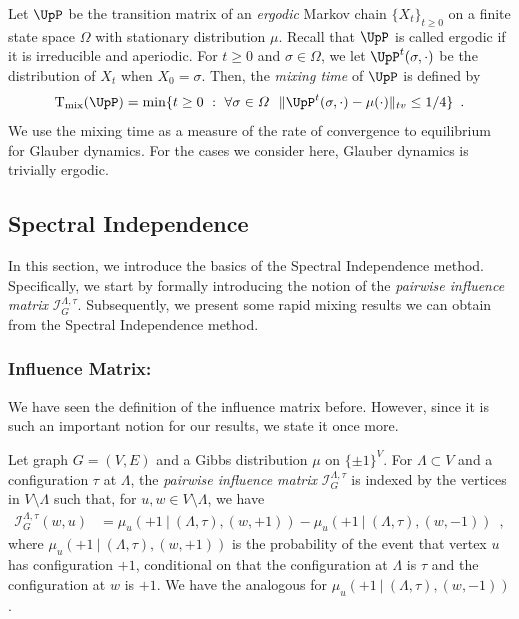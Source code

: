 \documentclass[11pt,reqno]{amsart}
\numberwithin{equation}{section}
\newcommand{\cI}{{\mathcal{I}}}
\newcommand{\blue}[1]{{\color{blue}#1}}
\newcommand{\cadmiumorange}[1]{{\color{cadmiumorange}#1}}
\newcommand{\goldenbrown}[1]{{\color{goldenbrown}#1}}
\newcommand{\red}[1]{{\color{red}#1}}
\newcommand{\Glauber}{{\{X_{\kt}\}_{\kt\geq 0}}}
\newcommand{\infmatrix}{\cI}
\newcommand{\norm}[2]{\goldenbrown{\|} #1 \goldenbrown{\|}_{#2}}
\newcommand{\tv}{tv}
\renewcommand{\blue}[1]{#1}
\renewcommand{\cadmiumorange}[1]{#1}
\renewcommand{\goldenbrown}[1]{#1}
\renewcommand{\red}[1]{#1}
\newcommand{\kt}{\cadmiumorange{t}}
\newcommand{\ku}{\red{u}}
\newcommand{\kw}{\blue{w}}
\renewcommand{\kt}{t}
\renewcommand{\ku}{u}
\renewcommand{\kw}{w}
\begin{document}
Let $\UpP$ be the transition matrix of an {\em ergodic} Markov chain $\Glauber$ on a finite state space
$\Omega$ with stationary distribution $\mu$. Recall that $\UpP$ is called ergodic if it is irreducible and aperiodic. 
%
For $\kt\geq 0$ and $\sigma\in \Omega$, we let $\UpP^{\kt}(\sigma, \cdot)$  be the distribution of $X_{\kt}$ when $X_0=\sigma$. Then, the {\em mixing time} of $\UpP$ is defined by 
\begin{align}\nonumber 
{\rm T}_{\rm mix}(\UpP)=\min\{\kt\geq 0\ :\ \forall \sigma\in \Omega \ \ \norm{\UpP^{\kt}(\sigma, \cdot)-\mu(\cdot)}{\tv}\leq 1/4\} \enspace.
\end{align}
We use the mixing time as a measure of the rate of convergence to equilibrium for Glauber dynamics.
For the cases we consider here, Glauber dynamics is trivially ergodic. 


\subsection{Spectral Independence}\label{sec:SIPrelimIntro}
%
In this section, we introduce the  basics of the Spectral Independence method. Specifically, we start by formally
introducing the notion of the {\em pairwise influence matrix} $\infmatrix^{\Lambda,\tau}_{G}$. Subsequently, we 
present  some rapid mixing results  we can obtain from the Spectral Independence method. 

\subsubsection*{Influence Matrix:}
We have seen the definition of the influence matrix before. However, since it is such an important  notion for 
our  results, we state it once more. 


Let graph $G=(V,E)$ and a Gibbs distribution $\mu$ on $\{\pm 1\}^V$.  For  $\Lambda\subset V$ and a configuration 
$\tau$ at $\Lambda$,  the {\em pairwise influence matrix}  $\infmatrix^{\Lambda,\tau}_{G}$ is   indexed by the vertices 
in $V\setminus \Lambda $  such that, for $\ku,\kw\in V\setminus \Lambda$, we have
%
\begin{align}\label{def:InfluenceMatrix}
\infmatrix^{\Lambda,\tau}_{G}(\kw,\ku) &
= \mu_{\ku}(+1 \ |\ (\Lambda, \tau), (\kw, +1))- \mu_{\ku}(+1 \ |\ (\Lambda, \tau), (\kw, -1)) \enspace, 
\end{align} 
%
where $\mu_{\ku}(+1 \ |\ (\Lambda, \tau), (\kw, +1))$ is the probability of the event that vertex $\ku$  has configuration
 $+1$, conditional on  that the configuration at $\Lambda$ is $\tau$ and the  configuration at $\kw$ is $+1$. We have 
 the analogous for $\mu_{\ku}(+1 \ |\ (\Lambda, \tau), (\kw, -1))$.
\end{document}
